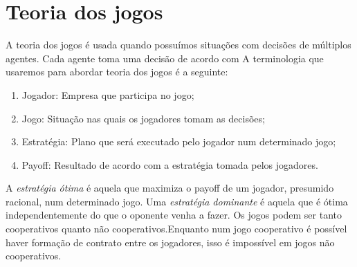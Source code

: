 \documentclass[12pt,a4paper,oneside,brazil]{abntex2}
\begin{document}
\section{Teoria dos jogos}
A teoria dos jogos é usada quando possuímos situações com decisões de múltiplos agentes. Cada agente toma uma decisão de acordo com  
A terminologia que usaremos para abordar teoria dos jogos é a seguinte:

\begin{enumerate}
	\item Jogador: Empresa que participa no jogo;
	\item Jogo: Situação nas quais os jogadores tomam as decisões;
	\item Estratégia: Plano que será executado pelo jogador num determinado jogo;
	\item Payoff: Resultado de acordo com a estratégia tomada pelos jogadores.
\end{enumerate}

A \emph{estratégia ótima} é aquela que maximiza o payoff de um jogador, presumido racional, num determinado jogo. Uma \emph{estratégia dominante} é aquela que é ótima independentemente do que o oponente venha a fazer. Os jogos podem ser tanto cooperativos quanto não cooperativos.Enquanto num jogo cooperativo é possível haver formação de contrato entre os jogadores, isso é impossível em jogos não cooperativos.

\printbibliography
\end{document}
